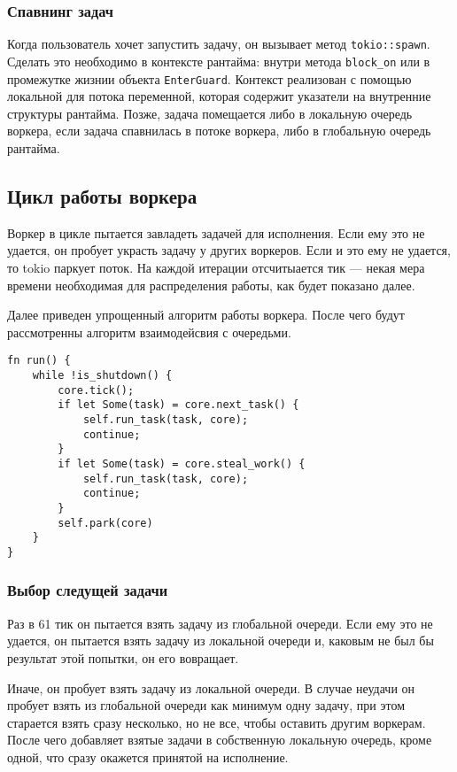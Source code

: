 \subsubsection{Спавнинг задач}

Когда пользователь хочет запустить задачу, он вызывает метод \verb|tokio::spawn|. Сделать это необходимо в контексте рантайма: внутри метода \verb|block_on| или в промежутке жизнии объекта \verb|EnterGuard|. Контекст реализован с помощью локальной для потока переменной, которая содержит указатели на внутренние структуры рантайма. Позже, задача помещается либо в локальную очередь воркера, если задача спавнилась в потоке воркера, либо в глобальную очередь рантайма.

\newpage

\subsection{Цикл работы воркера}

Воркер в цикле пытается завладеть задачей для исполнения. Если ему это не удается, он пробует украсть задачу у других воркеров. Если и это ему не удается, то tokio паркует поток. На каждой итерации отсчитыается тик --- некая мера времени необходимая для распределения работы, как будет показано далее.

Далее приведен упрощенный алгоритм работы воркера. После чего будут рассмотренны алгоритм взаимодейсвия с очередьми.

\begin{verbatim}
fn run() {
    while !is_shutdown() {
        core.tick();
        if let Some(task) = core.next_task() {
            self.run_task(task, core);
            continue;
        }
        if let Some(task) = core.steal_work() {
            self.run_task(task, core);
            continue;
        }
        self.park(core)
    }
}
\end{verbatim}

\subsubsection{Выбор следущей задачи}

Раз в 61 тик он пытается взять задачу из глобальной очереди. Если ему это не удается, он пытается взять задачу из локальной очереди и, каковым не был бы результат этой попытки, он его вовращает.

Иначе, он пробует взять задачу из локальной очереди. В случае неудачи он пробует взять из глобальной очереди как минимум одну задачу, при этом старается взять сразу несколько, но не все, чтобы оставить другим воркерам. После чего добавляет взятые задачи в собственную локальную очередь, кроме одной, что сразу окажется принятой на исполнение.

